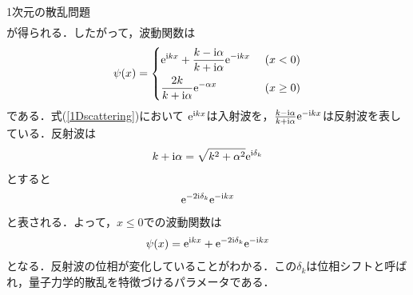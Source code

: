 \documentclass{report}
\begin{document}
\begin{myex}{1次元の散乱問題}{}
\begin{align}
    \end{align}
    が得られる．したがって，波動関数は
    \begin{align}
      \psi(x) = 
      \begin{dcases}
        \label{1Dscattering}
        \e^{\i kx} + \frac{k -\i\alpha}{k + \i\alpha} \e^{-\i kx}\ &(x < 0) \\
        \frac{2k}{k + \i\alpha}\e^{-\alpha x}\ &(x \geq 0)
      \end{dcases}
    \end{align}
    である．式(\ref{1Dscattering})において
    $\mathrm{e}^{\mathrm{i} kx}$は入射波を，$\frac{k -\mathrm{i}\alpha}{k + \mathrm{i}\alpha} \mathrm{e}^{-\mathrm{i} kx}$は反射波を表している．反射波は
    \begin{align}
      k + \mathrm{i}\alpha = \sqrt{k^2 + \alpha^2} \mathrm{e}^{\mathrm{i}\delta_k}
    \end{align}
    とすると
    \begin{align}
      \mathrm{e}^{-2 \mathrm{i} \delta_k}\mathrm{e}^{-\mathrm{i} kx}
    \end{align}
    と表される．よって，$x \leq 0$での波動関数は
    \begin{align}
      \psi(x) = \mathrm{e}^{\mathrm{i} kx} + \mathrm{e}^{-2 \mathrm{i} \delta_k}\mathrm{e}^{-\mathrm{i} kx}
    \end{align}
    となる．反射波の位相が変化していることがわかる．この$\delta_k$は位相シフトと呼ばれ，量子力学的散乱を特徴づけるパラメータである．
  \end{myex}
\end{document}
